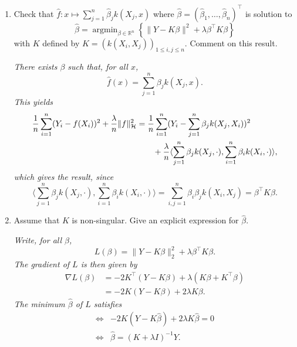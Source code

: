 \documentclass[a4paper,10pt,fleqn]{article}
\newcommand{\R}{\ensuremath{\mathbb{R}}}
\newcommand{\1}{\ensuremath{\mathbbm{1}}}
\newcommand{\argmin}{\mathop{\textrm{argmin}}}
\begin{document}
\begin{enumerate}
	\item Check that $\widehat f:x\mapsto \sum_{j=1}^n\widehat \beta_{j}k(X_{j},x)$ where $\widehat \beta=(\widehat \beta_{1},\ldots,\widehat \beta_{n})^\top$ is solution to
	$$ \widehat \beta=\argmin_{\beta\in\R^n}\left\{\|Y-K\beta\|^2+{\lambda} \beta^\top K\beta\right\}$$
	with $K$ defined by $K=(k(X_{i},X_{j}))_{1\leq i,j\leq n}$. Comment on this result.

\vspace{.2cm}

{\em
There exists $ \beta$ such that, for all $x$,
$$
			\widehat{f}(x) = \sum_{j=1}^n \beta_j k(X_j, x).
$$
This yields
		\begin{align*}
			{1\over n}\sum_{i=1}^n(Y_{i}-f(X_{i}))^2+{\lambda\over n} \|f\|_{\mathcal{H}}^2 
			& = {1\over n}\sum_{i=1}^n(Y_{i}-\sum_{j=1}^n \beta_j k(X_j, X_i))^2 \\
			&\qquad+{\lambda\over n} \langle \sum_{j=1}^n \beta_j k(X_j, \cdot), \sum_{i=1}^n \beta_i k(X_i, \cdot) \rangle,
		\end{align*}
	which gives the result, since 
$$
		\langle \sum_{j=1}^n \beta_j k(X_j, \cdot), \sum_{i=1}^n \beta_i k(X_i, \cdot) \rangle  = \sum_{i,j=1}^n \beta_i \beta_j k(X_i, X_j) = \beta^\top K \beta.
$$
}
	\item Assume that $K$ is non-singular. Give an explicit expression for $\widehat \beta$.

\vspace{.2cm}

{\em
Write, for all $\beta$,
$$
			L(\beta) = \| Y - K \beta\|_2^2 + \lambda \beta^\top K \beta.
$$
		The gradient of $L$ is then given by
		\begin{align*}
			\nabla L (\beta) & = -2K^\top (Y - K \beta) + \lambda (K \beta + K^\top \beta)  \\
			& = -2K(Y-K \beta) + 2 \lambda K \beta.
	\end{align*}
	The minimum $\widehat{\beta}$ of $L$ satisfies 
	\begin{align*}
		\Leftrightarrow & -2K(Y-K \widehat{\beta}) + 2 \lambda K \widehat{\beta} = 0\\
		\Leftrightarrow & \widehat{\beta} = (K + \lambda I)^{-1} Y.
	\end{align*}
}
\end{enumerate}
\end{document}
